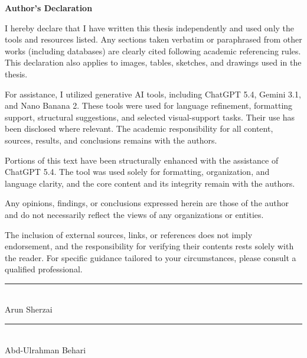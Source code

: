 \begin{flushleft}
\Large

\textbf{Author's Declaration\\}
\vspace{0.3cm}
\end{flushleft}

I hereby declare that I have written this thesis independently and used only the tools and resources listed. Any sections taken verbatim or paraphrased from other works (including databases) are clearly cited following academic referencing rules. This declaration also applies to images, tables, sketches, and drawings used in the thesis. 

For assistance, I utilized generative AI tools, including ChatGPT 5.4, Gemini 3.1, and Nano Banana 2. These tools were used for language refinement, formatting support, structural suggestions, and selected visual-support tasks. Their use has been disclosed where relevant. The academic responsibility for all content, sources, results, and conclusions remains with the authors.

Portions of this text have been structurally enhanced with the assistance of ChatGPT 5.4. The tool was used solely for formatting, organization, and language clarity, and the core content and its integrity remain with the authors.

Any opinions, findings, or conclusions expressed herein are those of the author and do not necessarily reflect the views of any organizations or entities.

The inclusion of external sources, links, or references does not imply endorsement, and the responsibility for verifying their contents rests solely with the reader. For specific guidance tailored to your circumstances, please consult a qualified professional.

\vspace{1.5cm}

\noindent
\begin{minipage}{0.45\textwidth}
	\begin{center}
		\rule{\linewidth}{1pt} \\
		Arun Sherzai
	\end{center}
\end{minipage}
\hfill
\begin{minipage}{0.45\textwidth}
	\begin{center}
		\rule{\linewidth}{1pt} \\
		Abd-Ulrahman Behari
	\end{center}
\end{minipage}

